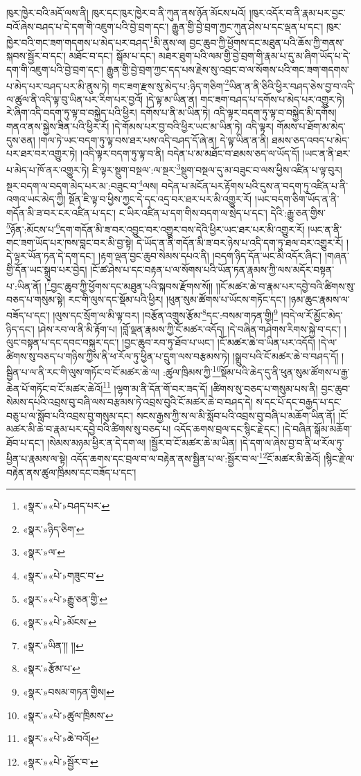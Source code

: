 ཁུར་ཁྱེར་བའི་མདོ་ལས་ནི། ཁུར་དང་ཁུར་ཁྱེར་བ་ནི་ཀུན་ནས་ཉོན་མོངས་པའོ། །ཁུར་འདོར་བ་ནི་རྣམ་པར་བྱང་བའོ་ཞེས་བཤད་པ་དེ་དག་གི་འཇུག་པའི་བྱེ་བྲག་དང་། རྒྱུན་གྱི་བྱེ་བྲག་ཀྱང་ཀུན་ཤེས་པ་དང་ལྡན་པ་དང་། ཁུར་ཁྱེར་བའི་གང་ཟག་གདགས་པ་མེད་པར་བཤད་\footnote{«སྣར་»«པེ་»བཤད་པར་}མི་ནུས་ལ། བྱང་ཆུབ་ཀྱི་ཕྱོགས་དང་མཐུན་པའི་ཆོས་ཀྱི་གནས་སྐབས་སྦྱོར་བ་དང་། མཐོང་བ་དང་། སྒོམ་པ་དང་། མཐར་ཐུག་པའི་ལམ་གྱི་བྱེ་བྲག་གི་རྣམ་པ་དུ་མ་ཞིག་ཡོད་པ་དེ་དག་གི་འཇུག་པའི་བྱེ་བྲག་དང་། རྒྱུན་གྱི་བྱེ་བྲག་ཀྱང་དད་པས་རྗེས་སུ་འབྲང་བ་ལ་སོགས་པའི་གང་ཟག་གདགས་པ་མེད་པར་བཤད་པར་མི་ནུས་ཏེ། གང་ཟག་རྫས་སུ་མེད་པ་:ཉིད་གཅིག་\footnote{«སྣར་»ཉིད་ཅིག་}ཡིན་ན་ནི་ཅིའི་ཕྱིར་བཤད་ཅེས་བྱ་བ་འདི་ལ་ཚུལ་ནི་འདི་ལྟ་བུ་ཡིན་པར་རིག་པར་བྱའོ། །དེ་ལྟ་མ་ཡིན་ན། གང་ཟག་བཤད་པ་དགོས་པ་མེད་པར་འགྱུར་ཏེ། རེ་ཞིག་འདི་བདག་ཏུ་ལྟ་བ་བསྐྱེད་པའི་ཕྱིར། དགོས་པ་ནི་མ་ཡིན་ཏེ། འདི་ལྟར་བདག་ཏུ་ལྟ་བ་བསྐྱེད་མི་དགོས། གནའ་ནས་སྐྱེས་ཟིན་པའི་ཕྱིར་རོ། །དེ་གོམས་པར་བྱ་བའི་ཕྱིར་ཡང་མ་ཡིན་ཏེ། འདི་ལྟར། གོམས་པ་ཐོག་མ་མེད་དུས་ཅན། །གལ་ཏེ་ཡང་བདག་ཏུ་ལྟ་བས་ཐར་པས་འདི་བཤད་དོ་ཞེ་ན། དེ་ལྟ་ཡིན་ན་ནི། ཐམས་ཅད་འབད་པ་མེད་པར་ཐར་བར་འགྱུར་ཏེ། །འདི་ལྟར་བདག་ཏུ་ལྟ་བ་ནི། བདེན་པ་མ་མཐོང་བ་ཐམས་ཅད་ལ་ཡོད་དོ། །ཡང་ན་ནི་ཐར་པ་མེད་པ་ཁོ་ནར་འགྱུར་ཏེ། ཇི་ལྟར་སྡུག་བསྔལ་:ལ་སྔར་\footnote{«སྣར་»ལ་}སྡུག་བསྔལ་དུ་མ་བཟུང་བ་ལས་ཕྱིས་འཛིན་པ་ལྟ་བུར། སྔར་བདག་ལ་བདག་མེད་པར་མ་:བཟུང་བ་\footnote{«སྣར་»«པེ་»གཟུང་བ་}ལས། བདེན་པ་མངོན་པར་རྟོགས་པའི་དུས་ན་བདག་ཏུ་འཛིན་པ་ནི་འགའ་ཡང་མེད་ཀྱི། སྔོན་ཇི་ལྟ་བ་ཕྱིས་ཀྱང་དེ་དང་འདྲ་བར་ཐར་པར་མི་འགྱུར་རོ། །ཡང་བདག་ཅིག་ཡོད་ན་ནི་གདོན་མི་ཟ་བར་ངར་འཛིན་པ་དང་། ང་ཡིར་འཛིན་པ་དག་གིས་བདག་ལ་སྲེད་པ་དང་། དེའི་:རྒྱུ་ཅན་གྱིས་\footnote{«སྣར་»«པེ་»རྒྱུ་ཅན་གྱི་}ཉོན་:མོངས་པ་\footnote{«སྣར་»«པེ་»མོངས་}དག་གདོན་མི་ཟ་བར་འབྱུང་བར་འགྱུར་བས་དེའི་ཕྱིར་ཡང་ཐར་པར་མི་འགྱུར་རོ། །ཡང་ན་ནི་གང་ཟག་ཡོད་པར་ཁས་བླང་བར་མི་བྱ་སྟེ། དེ་ཡོད་ན་ནི་གདོན་མི་ཟ་བར་ཉེས་པ་འདི་དག་ཏུ་ཐལ་བར་འགྱུར་རོ། །དེ་ལྟར་ཡོན་ཏན་དེ་དག་དང་། །རྟག་ལྡན་བྱང་ཆུབ་སེམས་དཔའ་ནི། །བདག་ཉིད་དོན་ཡང་མི་འདོར་ཞིང་། །གཞན་གྱི་དོན་ཡང་སྒྲུབ་པར་བྱེད། །ངོ་ཚ་ཤེས་པ་དང་བརྟན་པ་ལ་སོགས་པའི་ཡོན་ཏན་རྣམས་ཀྱི་ལས་མདོར་བསྟན་པ་:ཡིན་ནོ། །\footnote{«སྣར་»ཡིན་།། །།}བྱང་ཆུབ་ཀྱི་ཕྱོགས་དང་མཐུན་པའི་སྐབས་རྫོགས་སོ།། །།ངོ་མཚར་ཆེ་བ་རྣམ་པར་དབྱེ་བའི་ཚིགས་སུ་བཅད་པ་གསུམ་སྟེ། རང་གི་ལུས་དང་སྡོམ་པའི་ཕྱིར། །ཕུན་སུམ་ཚོགས་པ་ཡོངས་གཏོང་དང་། །ཉམ་ཆུང་རྣམས་ལ་བཟོད་པ་དང་། །ལུས་དང་སྲོག་ལ་མི་ལྟ་བར། །བརྩོན་འགྲུས་རྩོམ་\footnote{«སྣར་»རྩོམ་པ་}དང་:བསམ་གཏན་གྱི།\footnote{«སྣར་»བསམ་གཏན་གྱིས།} །བདེ་ལ་རོ་མྱོང་མེད་ཉིད་དང་། །ཤེས་རབ་ལ་ནི་མི་རྟོག་པ། །བློ་ལྡན་རྣམས་ཀྱི་ངོ་མཚར་འདོད། །དེ་བཞིན་གཤེགས་རིགས་སྐྱེ་བ་དང་། །ལུང་བསྟན་པ་དང་དབང་བསྐུར་དང་། །བྱང་ཆུབ་རབ་ཏུ་ཐོབ་པ་ཡང་། །ངོ་མཚར་ཆེ་བ་ཡིན་པར་འདོད། །དེ་ལ་ཚིགས་སུ་བཅད་པ་གཉིས་ཀྱིས་ནི་ཕ་རོལ་ཏུ་ཕྱིན་པ་དྲུག་ལས་བརྩམས་ཏེ། །སྒྲུབ་པའི་ངོ་མཚར་ཆེ་བ་བཤད་དོ། །སྦྱིན་པ་ལ་ནི་རང་གི་ལུས་གཏོང་བ་ངོ་མཚར་ཆེ་ལ། :ཚུལ་ཁྲིམས་ཀྱི་\footnote{«སྣར་»«པེ་»ཚུལ་ཁྲིམས་}སྡོམ་པའི་ཆེད་དུ་ནི་ཕུན་སུམ་ཚོགས་པ་རྒྱ་ཆེན་པོ་གཏོང་བ་ངོ་མཚར་ཆེའོ།\footnote{«སྣར་»«པེ་»ཆེ་བའོ།} །ལྷག་མ་ནི་དོན་གོ་བར་ཟད་དོ། །ཚིགས་སུ་བཅད་པ་གསུམ་པས་ནི། བྱང་ཆུབ་སེམས་དཔའི་འབྲས་བུ་བཞི་ལས་བརྩམས་ཏེ་འབྲས་བུའི་ངོ་མཚར་ཆེ་བ་བཤད་དེ། ས་དང་པོ་དང་བརྒྱད་པ་དང་བཅུ་པ་ལ་སློབ་པའི་འབྲས་བུ་གསུམ་དང་། སངས་རྒྱས་ཀྱི་ས་ལ་མི་སློབ་པའི་འབྲས་བུ་བཞི་པ་མཆོག་ཡིན་ནོ། །ངོ་མཚར་མི་ཆེ་བ་རྣམ་པར་དབྱེ་བའི་ཚིགས་སུ་བཅད་པ། འདོད་ཆགས་བྲལ་དང་སྙིང་རྗེ་དང་། །དེ་བཞིན་སྒོམ་མཆོག་ཐོབ་པ་དང་། །སེམས་མཉམ་ཕྱིར་ན་དེ་དག་ལ། །སྦྱོར་བ་ངོ་མཚར་ཆེ་མ་ཡིན། །དེ་དག་ལ་ཞེས་བྱ་བ་ནི་ཕ་རོལ་ཏུ་ཕྱིན་པ་རྣམས་ལ་སྟེ། འདོད་ཆགས་དང་བྲལ་བ་ལ་བརྟེན་ནས་སྦྱིན་པ་ལ་:སྦྱོར་བ་ལ་\footnote{«སྣར་»«པེ་»སྦྱོར་བ་}ངོ་མཚར་མི་ཆེའོ། །སྙིང་རྗེ་ལ་བརྟེན་ནས་ཚུལ་ཁྲིམས་དང་བཟོད་པ་དང་། 
